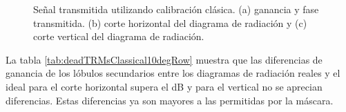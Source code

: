 \begin{figure}[H]
	\centering

	\caption{Señal transmitida utilizando calibración clásica. (a) ganancia y fase transmitida. (b) corte horizontal del 
	diagrama de radiación y (c) corte vertical del diagrama de radiación.}
	\label{fig:deadTRMsClassical10degRow}
\end{figure}

La tabla \ref{tab:deadTRMsClassical10degRow} muestra que las diferencias de ganancia de los lóbulos secundarios entre los 
diagramas de radiación reales y el ideal para el corte horizontal supera el dB y para el vertical no se aprecian diferencias. 
Estas diferencias ya son mayores a las permitidas por la máscara.


